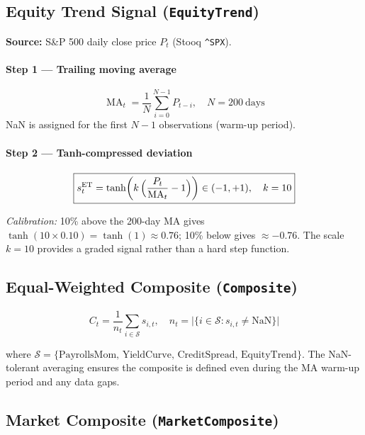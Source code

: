 \documentclass[11pt, a4paper]{article}
\begin{document}
\subsection{Equity Trend Signal (\texttt{EquityTrend})}
\label{sec:trend}

\textbf{Source:} S\&P 500 daily close price $P_t$ (Stooq \texttt{\^{}SPX}).

\paragraph{Step 1 — Trailing moving average}
\[
  \operatorname{MA}_t = \frac{1}{N}\sum_{i=0}^{N-1} P_{t-i},
  \quad N = 200\ \text{days}
\]
NaN is assigned for the first $N-1$ observations (warm-up period).

\paragraph{Step 2 — Tanh-compressed deviation}
\[
  \boxed{s_t^{\text{ET}} = \tanh\!\left(k\,\Bigl(\frac{P_t}{\operatorname{MA}_t} - 1\Bigr)\right) \in (-1,+1),
  \quad k = 10}
\]

\textit{Calibration:} 10\% above the 200-day MA gives
$\tanh(10 \times 0.10) = \tanh(1) \approx 0.76$; 10\% below gives $\approx -0.76$.
The scale $k = 10$ provides a graded signal rather than a hard step function.

\subsection{Equal-Weighted Composite (\texttt{Composite})}
\label{sec:composite}

\[
  \boxed{C_t = \frac{1}{n_t}\sum_{i \in \mathcal{S}} s_{i,t},
  \quad n_t = \bigl|\{i \in \mathcal{S} : s_{i,t} \neq \text{NaN}\}\bigr|}
\]

where $\mathcal{S} = \{\text{PayrollsMom},\,\text{YieldCurve},\,\text{CreditSpread},\,\text{EquityTrend}\}$.
The NaN-tolerant averaging ensures the composite is defined even during the
MA warm-up period and any data gaps.

\subsection{Market Composite (\texttt{MarketComposite})}
\label{sec:mktcomp}
\end{document}
